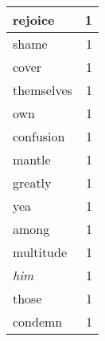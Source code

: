 \begin{center}
\begin{longtable}{l|r}
rejoice & 1 \\ \hline
shame & 1 \\ \hline
cover & 1 \\ \hline
themselves & 1 \\ \hline
own & 1 \\ \hline
confusion & 1 \\ \hline
mantle & 1 \\ \hline
greatly & 1 \\ \hline
yea & 1 \\ \hline
among & 1 \\ \hline
multitude & 1 \\ \hline
\emph{him} & 1 \\ \hline
those & 1 \\ \hline
condemn & 1 \\ \hline
\end{longtable}
\end{center}



\normalsize



